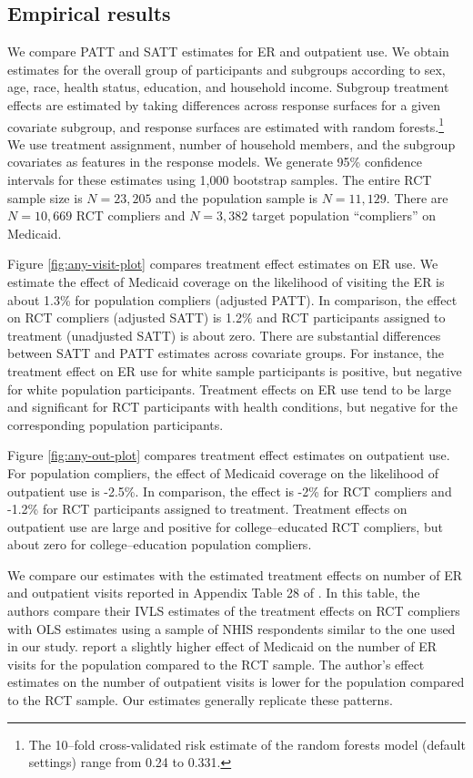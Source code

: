 \documentclass[12pt]{article}
\begin{document}
\subsection{Empirical results}

We compare PATT and SATT estimates for ER and outpatient use. We obtain estimates for the overall group of participants and subgroups according to sex, age, race, health status, education, and household income. Subgroup treatment effects are estimated by taking differences across response surfaces for a given covariate subgroup, and response surfaces are estimated with random forests.\footnote{The 10--fold cross-validated risk estimate of the random forests model (default settings) range from 0.24 to 0.331.} We use treatment assignment, number of household members, and the subgroup covariates as features in the response models. We generate 95\% confidence intervals for these estimates using 1,000 bootstrap samples. The entire RCT sample size is $N=23,205$ and the population sample is $N=11,129$. There are $N=10,669$ RCT compliers and $N=3,382$ target population ``compliers'' on Medicaid. 

Figure \ref{fig:any-visit-plot} compares treatment effect estimates on ER use. We estimate the effect of Medicaid coverage on the likelihood of visiting the ER is about 1.3\% for population compliers (adjusted PATT). In comparison, the effect on RCT compliers (adjusted SATT) is 1.2\% and RCT participants assigned to treatment (unadjusted SATT) is about zero. There are substantial differences between SATT and PATT estimates across covariate groups. For instance, the treatment effect on ER use for white sample participants is positive, but negative for white population participants. Treatment effects on ER use tend to be large and significant for RCT participants with health conditions, but negative for the corresponding population participants.

Figure \ref{fig:any-out-plot} compares treatment effect estimates on outpatient use. For population compliers, the effect of Medicaid coverage on the likelihood of outpatient use is -2.5\%. In comparison, the effect is -2\% for RCT compliers and -1.2\% for RCT participants assigned to treatment. Treatment effects on outpatient use are large and positive for college--educated RCT compliers, but about zero for college--education population compliers. 



We compare our estimates with the estimated treatment effects on number of ER and outpatient visits  reported in Appendix Table 28 of \citet{finkelstein2012}. In this table, the authors compare their IVLS estimates of the treatment effects on RCT compliers with OLS estimates using a sample of NHIS respondents similar to the one used in our study. \citet{finkelstein2012} report a slightly higher effect of Medicaid on the number of ER visits for the population compared to the RCT sample. The author's effect estimates on the number of outpatient visits is lower for the population compared to the RCT sample. Our estimates generally replicate these patterns. 
\end{document}
